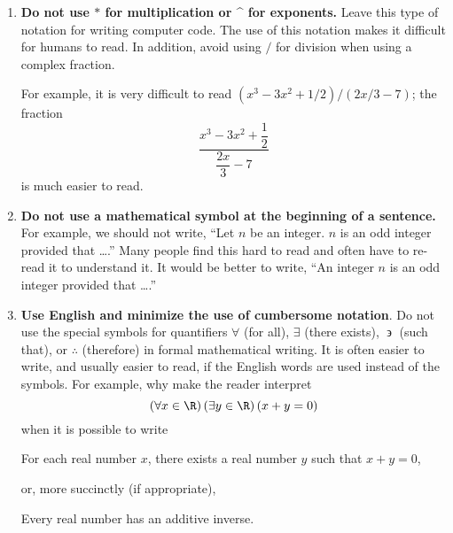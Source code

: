 \begin{enumerate}
\item \textbf{Do not use $*$ for multiplication or \^{} for exponents.}
Leave this type of notation for writing computer code.  The use of this notation makes it difficult for humans to read.  In addition, avoid using $/$ for division when using a complex fraction.  

For example, it is very difficult to read 
$\left(x^3 -3x^2 + 1/2 \right)\!/\!\left(2x/3 - 7\right)$; the fraction
\[
\frac{x^3 - 3x^2 +\dfrac{1}{2}}{\dfrac{2x}{3} - 7}
\]
is much easier to read.

\item \textbf{Do not use a mathematical symbol at the beginning of a sentence.}
For example, we should not write, ``Let $n$ be an integer.  $n$ is an odd integer provided that \ldots .''  Many people find this hard to read and often have to re-read it to understand it.  It would be better to write, ``An integer $n$ is an odd integer provided that \ldots .''

\item \textbf{Use English and minimize the use of cumbersome notation}.  Do not use the special symbols for quantifiers $\forall$ (for all), 
$\exists$ (there exists), $\mathrel\backepsilon$ (such that), or $\therefore $ (therefore) in formal mathematical writing.  It is often easier to write, and usually easier to read, if the English words are used instead of the symbols.  For example, why make the reader interpret
\[
\left( \forall x \in \R \right) \left( \exists y \in \R \right)\left( x + y = 0 \right)
\]
when it is possible to write
\begin{center}
For each real number $x$, there exists a real number $y$ such that $x + y = 0$,
\end{center}
or, more succinctly (if appropriate),
\begin{center}
Every real number has an additive inverse.
\end{center}
\end{enumerate}
%
\hbreak

\endinput
